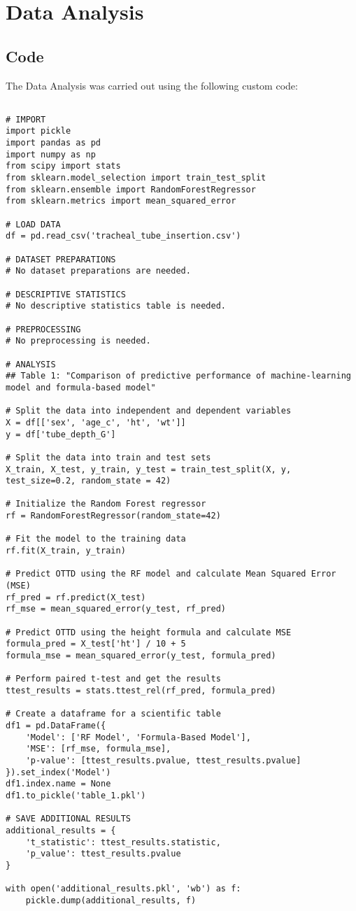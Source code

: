 \documentclass[11pt]{article}
\begin{document}
\section{Data Analysis}
\subsection{{Code}}
The Data Analysis was carried out using the following custom code:

\begin{verbatim}

# IMPORT
import pickle
import pandas as pd
import numpy as np
from scipy import stats
from sklearn.model_selection import train_test_split
from sklearn.ensemble import RandomForestRegressor
from sklearn.metrics import mean_squared_error

# LOAD DATA
df = pd.read_csv('tracheal_tube_insertion.csv')

# DATASET PREPARATIONS
# No dataset preparations are needed.

# DESCRIPTIVE STATISTICS
# No descriptive statistics table is needed.

# PREPROCESSING 
# No preprocessing is needed.

# ANALYSIS
## Table 1: "Comparison of predictive performance of machine-learning model and formula-based model"

# Split the data into independent and dependent variables
X = df[['sex', 'age_c', 'ht', 'wt']]
y = df['tube_depth_G']

# Split the data into train and test sets
X_train, X_test, y_train, y_test = train_test_split(X, y, test_size=0.2, random_state = 42)

# Initialize the Random Forest regressor
rf = RandomForestRegressor(random_state=42)

# Fit the model to the training data
rf.fit(X_train, y_train)

# Predict OTTD using the RF model and calculate Mean Squared Error (MSE)
rf_pred = rf.predict(X_test)
rf_mse = mean_squared_error(y_test, rf_pred)

# Predict OTTD using the height formula and calculate MSE
formula_pred = X_test['ht'] / 10 + 5
formula_mse = mean_squared_error(y_test, formula_pred)

# Perform paired t-test and get the results
ttest_results = stats.ttest_rel(rf_pred, formula_pred)

# Create a dataframe for a scientific table
df1 = pd.DataFrame({
    'Model': ['RF Model', 'Formula-Based Model'],
    'MSE': [rf_mse, formula_mse],
    'p-value': [ttest_results.pvalue, ttest_results.pvalue]
}).set_index('Model')
df1.index.name = None
df1.to_pickle('table_1.pkl')

# SAVE ADDITIONAL RESULTS
additional_results = {
    't_statistic': ttest_results.statistic,
    'p_value': ttest_results.pvalue
}

with open('additional_results.pkl', 'wb') as f:
    pickle.dump(additional_results, f)

\end{verbatim}
\end{document}
